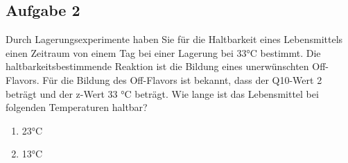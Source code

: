 \documentclass[a4paper,11pt]{article}
\newif\ifshowme
\begin{document}
\ifshowme
\antwort{

Formel für die Aufgabe:

\begin{align}
D_1 = D_2 \cdot 10^{\frac{T_2 - T_1}{z}}
\end{align}


Reduktion der Keimzahl:
\begin{align*}
D_1 &= 5 ~\text{min} \cdot 10^{\frac{112 - 121}{10}} \\
 &= 0,629 ~\text{min}
\end{align*}

Enzyminaktivierung:
\begin{align*}
D_1 &= 15 ~\text{min} \cdot 10^{\frac{90 - 121}{25}} \\
 &= 0,86 ~\text{min}
\end{align*}

Kochgeschmack
\begin{align*}
D_1 &= 20 ~\text{min} \cdot 10^{\frac{100 - 121}{32}} \\
 &= 4,413 ~\text{min}
\end{align*}

 Da 0,629 min + 0,012 min kürzer ist als 4,413 min, kann der Erhitzungsprozess bei dieser Temperatur
durchgeführt werden, ohne dass ein Kochgeschmack auftritt.
}
\else
\fi




\subsection*{Aufgabe 2}
Durch Lagerungsexperimente haben Sie für die Haltbarkeit eines Lebensmittels einen
Zeitraum von einem Tag bei einer Lagerung bei 33°C bestimmt. Die
haltbarkeitsbestimmende Reaktion ist die Bildung eines unerwünschten Off-Flavors. Für
die Bildung des Off-Flavors ist bekannt, dass der Q10-Wert 2 beträgt und der z-Wert 33 °C
beträgt. Wie lange ist das Lebensmittel bei folgenden Temperaturen haltbar?

\begin{enumerate}[label=\alph*)]
\item 23°C
\item 13°C
\end{enumerate}
\ifshowme
\antwort{
Über Q$_{10}$-Wert:
\begin{align*}
D_1 &= 1 ~\text{Tag} \cdot 2^{\frac{33-23}{10}} \\
&= 2 ~\text{Tage}
\end{align*}
Über Z-Wert:
\begin{align*}
D_1 &= 1 ~\text{Tag} \cdot 10^{\frac{33-23}{33}} \\
 &= 2 ~\text{Tage}
\end{align*}

b) 4 Tage \pp
c) 8 Tage \pp
d) 10 Tage  
}
\else
\fi
\end{document}
